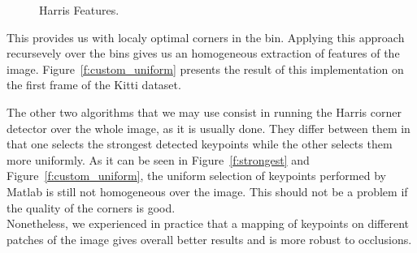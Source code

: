 \begin{figure}[b]
\caption[Harris Features]{\label{f:harris}Harris Features.}
\end{figure}

This provides us with localy optimal corners in
the bin. Applying this approach recursevely over the bins gives us an homogeneous extraction of features of the image. Figure~\ref{f:custom_uniform} 
presents the result of this implementation on the first frame of the Kitti dataset.

The other two algorithms that we may use consist in running the Harris corner detector over the whole image, as it is usually done. They differ between them in that one selects the strongest detected keypoints while the other selects them more uniformly. As it can be seen in Figure~\ref{f:strongest} and Figure~\ref{f:custom_uniform}, the uniform selection of keypoints performed by Matlab is still not homogeneous over the image.
This should not be a problem if the quality of the corners is good. \\ Nonetheless, we experienced in practice that a mapping of keypoints on different
patches of the image gives overall better results and is more robust to occlusions.
